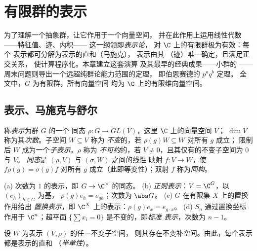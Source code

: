 \chapter{有限群的表示}\label{ch:b3:representations}

为了理解一个抽象群，让它作用于一个向量空间，
并在此作用上运用线性代数——特征值、迹、内积——
这一纲领即\emph{表示论}，
对 $\C$ 上的有限群极为有效：每个
表示都可分解为表示的直和（马施克），
表示由其\emph{}
（迹）唯一确定，且满足正交关系，
使计算程序化。本章建立这套演算
及其最早的经典成果——小群的
——周末问题则导出一个远超纯群论能力范围的定理，
即伯恩赛德的 $p^aq^b$ 定理。
全文中，$G$ 为有限群，所有向量空间
均为 $\C$ 上的有限维向量空间。

\section{表示、马施克与舒尔}

\begin{definition}\label{def:b3:representations:rep}
称\emph{表示}为群 $G$ 的一个
同态 $\rho \colon G \to GL(V)$，这里 $\C$ 上的向量空间 $V$；
$\dim V$ 称为其\emph{次数}。子空间 $W \subseteq V$ 称为
\emph{不变}的，若 $\rho(g)W \subseteq W$ 对所有 $g$ 成立；
限制后 $W$ 成为一个\emph{子表示}。$\rho$ 称为
\emph{不可约}的，若 $V \neq
0$，且其仅有的不变子空间为 $0$ 与 $V$。
\emph{同态}是 $(\rho, V)$ 与 $(\sigma, W)$ 之间的线性
映射 $f\colon V \to W$，使 $f\rho(g) = \sigma(g)f$ 对所有 $g$
成立（此即等变性）；双射 $f$ 称为\emph{同构}。
\end{definition}

\begin{example}\label{ex:b3:representations:examples}
(a) 次数为 $1$ 的表示，即 $G \to \C^\times$ 的同态。
(b) \emph{正则表示}：$V = \C^G$，以 $(e_h)_{h \in G}$ 为基，
$\rho(g)e_h = e_{gh}$；次数为 $\abs G$。
(c) $G$ 在有限集 $X$ 上的置换作用给出
\emph{置换表示}，即 $\C^X$ 上的表示：$\rho(g)e_x =
e_{g\cdot x}$。
(d) $S_n$ 通过置换坐标作用于 $\C^n$；超平面
$\{\sum x_i = 0\}$ 是不变的，即\emph{标准
表示}，次数为 $n - 1$。
\end{example}

\begin{theorem}[马施克]\label{thm:b3:representations:maschke}
设 $W$ 为表示 $(V, \rho)$ 的任一不变子空间，
则其存在不变补空间。由此，每个表示
都是表示的直和
（\emph{半单性}）。
\end{theorem}

